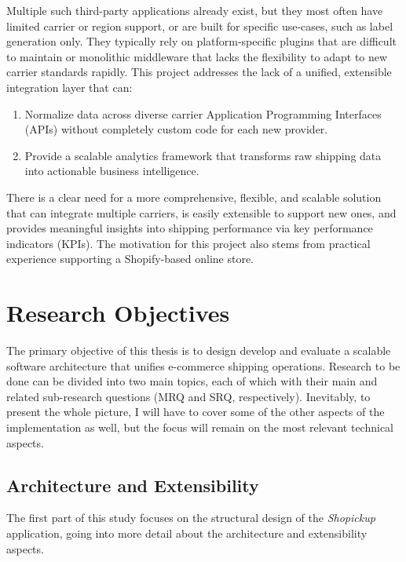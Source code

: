 \documentclass{imc-inf}
\begin{document}
Multiple such third-party applications already exist, but they most often have limited carrier or region support, or are built for specific use-cases, such as label generation only.
They typically rely on platform-specific plugins that are difficult to maintain or monolithic middleware that lacks the flexibility to adapt to new carrier standards rapidly.
This project addresses the lack of a unified, extensible integration layer that can:

\begin{enumerate}[label=\arabic*., left=0pt, itemsep=3pt]
  \item Normalize data across diverse carrier Application Programming Interfaces (APIs) without completely custom code for each new provider.
  \item Provide a scalable analytics framework that transforms raw shipping data into actionable business intelligence.
\end{enumerate}

There is a clear need for a more comprehensive, flexible, and scalable solution that can integrate multiple carriers, is easily extensible to support new ones, and provides meaningful insights into shipping performance via key performance indicators (KPIs).
The motivation for this project also stems from practical experience supporting a Shopify-based online store.

\section{Research Objectives}
The primary objective of this thesis is to design develop and evaluate a scalable software architecture that unifies e-commerce shipping operations.
Research to be done can be divided into two main topics, each of which with their main and related sub-research questions (MRQ and SRQ, respectively).
Inevitably, to present the whole picture, I will have to cover some of the other aspects of the implementation as well, but the focus will remain on the most relevant technical aspects.

\subsection{Architecture and Extensibility}
The first part of this study focuses on the structural design of the \textit{Shopickup} application, going into more detail about the architecture and extensibility aspects.
\end{document}
